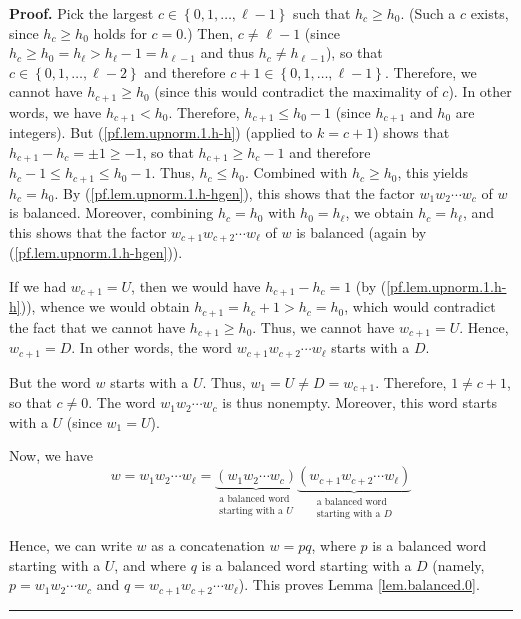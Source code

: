 \documentclass[numbers=enddot,12pt,final,onecolumn,notitlepage]{scrartcl}%
\theoremstyle{definition}
\newenvironment{proof}[1][Proof]{\noindent\textbf{#1.} }{\ \rule{0.5em}{0.5em}}
\newenvironment{verlong}{}{}
\begin{document}
\begin{verlong}
\begin{proof}
Pick the largest $c\in\left\{  0,1,\ldots,\ell-1\right\}  $ such that
$h_{c}\geq h_{0}$. (Such a $c$ exists, since $h_{c}\geq h_{0}$ holds
for $c=0$.) Then, $c\neq\ell-1$ (since $h_c \geq h_0 = h_\ell > h_\ell - 1 = h_{\ell-1}$ and thus $h_c \neq h_{\ell - 1}$), so that
$c\in\left\{  0,1,\ldots,\ell-2\right\}  $ and therefore $c+1\in\left\{
0,1,\ldots,\ell-1\right\}  $. Therefore, we cannot have $h_{c+1}\geq h_{0}$
(since this would contradict the maximality of $c$). In other words, we have
$h_{c+1}<h_{0}$. Therefore, $h_{c+1}\leq h_{0}-1$ (since $h_{c+1}$ and $h_{0}$
are integers).
But (\ref{pf.lem.upnorm.1.h-h}) (applied to $k = c+1$) shows that $h_{c+1}-h_{c}%
=\pm1\geq-1$, so that $h_{c+1}\geq h_{c}-1$ and therefore $h_{c}-1\leq
h_{c+1}\leq h_{0}-1$. Thus, $h_{c}\leq h_{0}$. Combined with $h_{c}\geq h_{0}%
$, this yields $h_{c}=h_{0}$. By (\ref{pf.lem.upnorm.1.h-hgen}), this shows
that the factor $w_{1}w_{2}\cdots w_{c}$ of $w$ is balanced. Moreover,
combining $h_{c}=h_{0}$ with $h_{0}=h_{\ell}$, we obtain $h_{c}=h_{\ell}$, and
this shows that the factor $w_{c+1}w_{c+2}\cdots w_{\ell}$ of $w$ is balanced
(again by (\ref{pf.lem.upnorm.1.h-hgen})).

If we had $w_{c+1}=U$, then we would have $h_{c+1}-h_{c}=1$ (by
(\ref{pf.lem.upnorm.1.h-h})), whence we would obtain $h_{c+1}=h_{c}%
+1>h_{c}=h_{0}$, which would contradict the fact that we cannot have
$h_{c+1}\geq h_{0}$. Thus, we cannot have $w_{c+1}=U$. Hence, $w_{c+1}=D$. In
other words, the word $w_{c+1}w_{c+2}\cdots w_{\ell}$ starts with a $D$.

But the word $w$ starts with a $U$. Thus, $w_{1}=U\neq D=w_{c+1}$. Therefore,
$1\neq c+1$, so that $c\neq0$. The word $w_{1}w_{2}\cdots w_{c}$ is thus
nonempty. Moreover, this word starts with a $U$ (since $w_{1}=U$).

Now, we have
\[
w=w_{1}w_{2}\cdots w_{\ell}=\underbrace{\left(  w_{1}w_{2}\cdots w_{c}\right)
}_{\substack{\text{a balanced word}\\\text{starting with a }U}%
}\underbrace{\left(  w_{c+1}w_{c+2}\cdots w_{\ell}\right)  }%
_{\substack{\text{a balanced word}\\\text{starting with a }D}}
\]


Hence, we can write $w$ as a concatenation $w=pq$, where $p$ is a balanced
word starting with a $U$, and where $q$ is a balanced word starting with a $D$
(namely, $p=w_{1}w_{2}\cdots w_{c}$ and $q=w_{c+1}w_{c+2}\cdots w_{\ell}$).
This proves Lemma \ref{lem.balanced.0}.
\end{proof}


\end{verlong}
\end{document}
